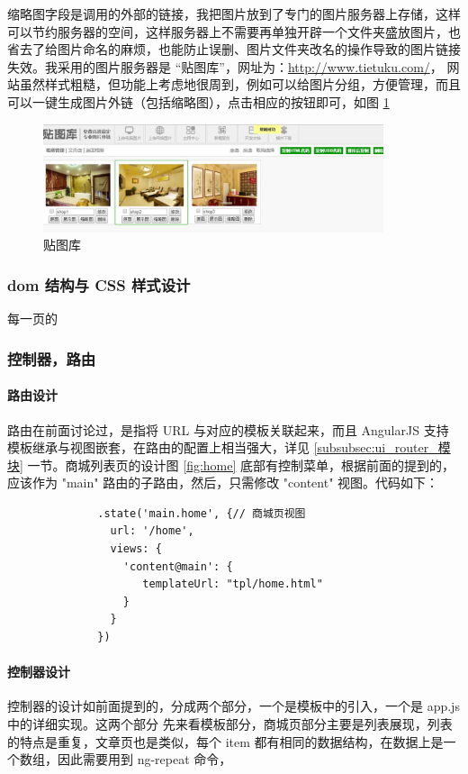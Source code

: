 \documentclass[UTF8]{ctexbook}
\begin{document}
            缩略图字段是调用的外部的链接，我把图片放到了专门的图片服务器上存储，这样可以节约服务器的空间，这样服务器上不需要再单独开辟一个文件夹盛放图片，也省去了给图片命名的麻烦，也能防止误删、图片文件夹改名的操作导致的图片链接失效。我采用的图片服务器是 “贴图库”，网址为：\url{http://www.tietuku.com/}， 网站虽然样式粗糙，但功能上考虑地很周到，例如可以给图片分组，方便管理，而且可以一键生成图片外链（包括缩略图），点击相应的按钮即可，如图 \ref{fig:tietuku}
            \begin{figure}[H]
              \centering
              \includegraphics[width=10cm]{./img/tietuku.jpg}
              \caption{贴图库}
              \label{fig:tietuku}
            \end{figure}

        \subsubsection{dom 结构与 CSS 样式设计}
          \label{subsubsec:dom_结构与_css_样式设计}
            每一页的

        \subsubsection{控制器，路由}
          \label{subsubsec:控制器_路由}
            \paragraph{路由设计} 路由在前面讨论过，是指将 URL 与对应的模板关联起来，而且 AngularJS 支持模板继承与视图嵌套，在路由的配置上相当强大，详见 \ref{subsubsec:ui_router_模块} 一节。商城列表页的设计图 \ref{fig:home} 底部有控制菜单，根据前面的提到的，应该作为 "main" 路由的子路由，然后，只需修改 "content" 视图。代码如下：
            \begin{lstlisting}
              .state('main.home', {// 商城页视图
                url: '/home',
                views: {
                  'content@main': {
                     templateUrl: "tpl/home.html"
                  }
                }
              })
            \end{lstlisting}

            \paragraph{控制器设计}
            控制器的设计如前面提到的，分成两个部分，一个是模板中的引入，一个是 app.js 中的详细实现。这两个部分
            先来看模板部分，商城页部分主要是列表展现，列表的特点是重复，文章页也是类似，每个 item 都有相同的数据结构，在数据上是一个数组，因此需要用到 ng-repeat 命令，
\end{document}
